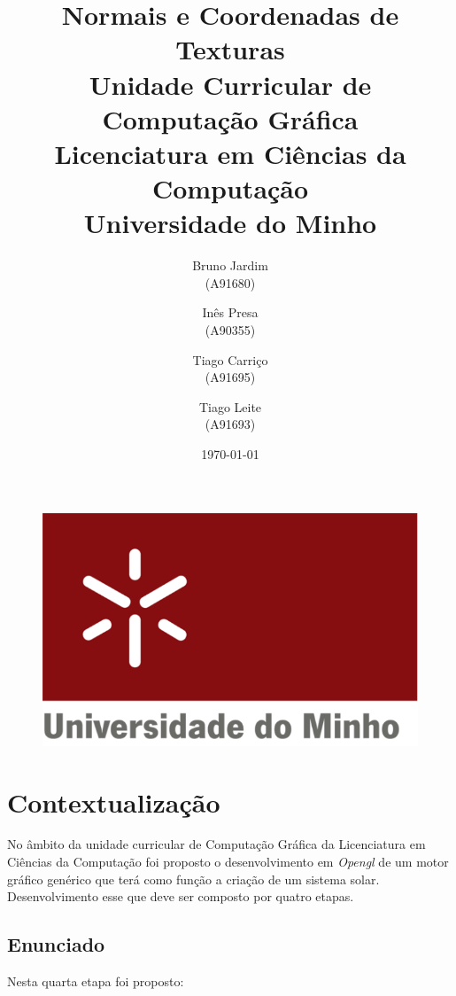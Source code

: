 \documentclass[11pt,a4paper]{report}
\begin{document}
\begin{figure}
    \includegraphics[scale=0.3]{logoum.png}
\end{figure}
\title{\textbf{Normais e Coordenadas de Texturas}\\
       \textbf{Unidade Curricular de Computação Gráfica}\\ Licenciatura em Ciências da Computação\\Universidade do Minho
       } %
\author{Bruno Jardim\\ (A91680) \and Inês Presa\\ (A90355)
         \and Tiago Carriço\\ (A91695) \and Tiago Leite\\ (A91693)
       } %
\date{\today} %
\maketitle
\begingroup
\renewcommand*\contentsname{Índice}
\let\clearpage\relax
\tableofcontents


\endgroup
\newpage

\chapter{Contextualização}    
No âmbito da unidade curricular de Computação Gráfica da Licenciatura em Ciências da Computação foi proposto o desenvolvimento em \textit{Opengl} de um motor gráfico genérico que terá como função a criação de um sistema solar. Desenvolvimento esse que deve ser composto por quatro etapas. 

\section{Enunciado}
Nesta quarta etapa foi proposto:
\end{document}
